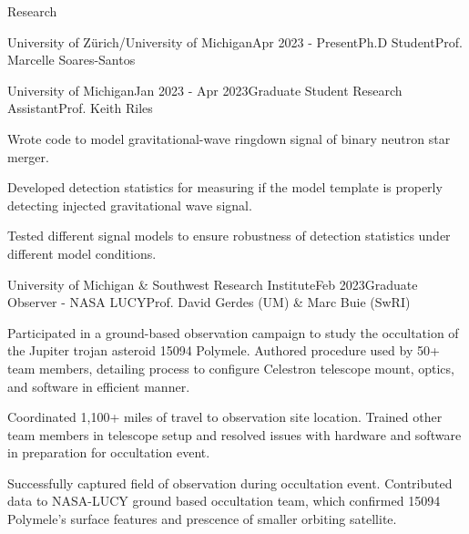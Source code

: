 \documentclass{resume} %
\begin{document}
\begin{rSection}{Research}
\begin{rSubsection}{University of Zürich/University of Michigan}{Apr 2023 - Present}{Ph.D Student}{Prof. Marcelle Soares-Santos}
\begin{rSubsection}{University of Michigan}{Jan 2023 - Apr 2023}{Graduate Student Research Assistant}{Prof. Keith Riles}
    \item Wrote code to model gravitational-wave ringdown signal of binary neutron star merger.
    \item Developed detection statistics for measuring if the model template is properly detecting injected gravitational wave signal. 
    \item Tested different signal models to ensure robustness of detection statistics under different model conditions.
\end{rSubsection}

\newpage

\begin{rSubsection}{University of Michigan \& Southwest Research Institute}{Feb 2023}{Graduate Observer - NASA LUCY}{Prof. David Gerdes (UM) \& Marc Buie (SwRI)}
    \item Participated in a ground-based observation campaign to study the occultation of the Jupiter trojan asteroid 15094 Polymele. Authored procedure used by 50+ team members, detailing process to configure Celestron telescope mount, optics, and software in efficient manner.
    \item Coordinated 1,100+ miles of travel to observation site location. Trained other team members in telescope setup and resolved issues with hardware and software in preparation for occultation event.
    \item Successfully captured field of observation during occultation event. Contributed data to NASA-LUCY ground based occultation team, which confirmed 15094 Polymele's surface features and prescence of smaller orbiting satellite.
\end{rSubsection}




\end{rSubsection}
\end{rSection}
\end{document}
